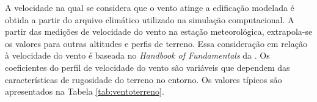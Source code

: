 \documentclass[brazil,hardcopy,openany]{ufscthesis} %
\begin{document}
A velocidade na qual se considera que o vento atinge a edificação modelada é obtida a partir do arquivo climático utilizado na simulação computacional. A partir das medições de velocidade do vento na estação meteorológica, extrapola-se os valores para outras altitudes e perfis de terreno. Essa consideração em relação à velocidade do vento é baseada no \textit{Handbook of Fundamentals} da .
Os coeficientes do perfil de velocidade do vento são variáveis que dependem das características de rugosidade do terreno no entorno. Os valores típicos são apresentados na Tabela \ref{tab:ventoterreno}.

\begin{table}[h]
	\caption{Coeficientes do perfil de velocidade do vento}
	\label{tab:ventoterreno}
	\centering
\end{table}
\end{document}
